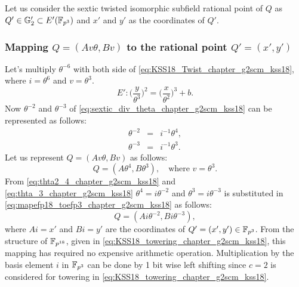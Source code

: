 Let us consider the sextic twisted isomorphic subfield rational point of $Q$ as $Q' \in {\mathbb{G}}_{2}' \subset E'({\mathbb{F}}_{p^{3}})$ and $x'$ and $y'$ as the coordinates of $Q'$.

\subsubsection{Mapping \texorpdfstring{$Q = (Av\theta, Bv)$}{}  to the rational point  \texorpdfstring{$Q' = (x',y')$}{}}

Let's multiply  $\theta^{-6}$ with both side of \eqref{eq:KSS18_Twist_chapter_g2scm_kss18}, where $i=\theta^6$ and $v = \theta^3$.
\begin{equation}\label{eq:sextic_div_theta_chapter_g2scm_kss18}
E':  \Big(\frac{y}{\theta^3}\Big)^2  = \Big(\frac{x}{\theta^2}\Big)^3+ b.
\end{equation}
 Now $\theta^{-2}$ and $\theta^{-3}$ of  \eqref{eq:sextic_div_theta_chapter_g2scm_kss18} can be represented as follows:
 \begin{subequations}
 \begin{eqnarray}
 \theta^{-2} &  = & i^{-1}\theta^{4}, \label{eq:thta2_4_chapter_g2scm_kss18} \\
 \theta^{-3} &  = & i^{-1}\theta^{3}.\label{eq:thta_3_chapter_g2scm_kss18} 
 \end{eqnarray}
 \end{subequations}
Let us represent $Q = (Av\theta, Bv)$  as follows:
\begin{equation}\label{eq:mapefp18_toefp3_chapter_g2scm_kss18}
Q  =  (A\theta^4, B\theta^3), \quad \text{where $v=\theta^3$}.
\end{equation}
From \eqref{eq:thta2_4_chapter_g2scm_kss18} and \eqref{eq:thta_3_chapter_g2scm_kss18} $ \theta^4 = i\theta^{-2}$ and $\theta^3 = i\theta^{-3}$  is substituted in \eqref{eq:mapefp18_toefp3_chapter_g2scm_kss18}  as 
follows:
\begin{equation}\label{eq:mapefp18_toefp3_chapter_g2scm_kss18.1}
Q  =  (Ai\theta^{-2}, Bi\theta^{-3}),
\end{equation}
where $Ai = x'$ and $Bi = y'$ are the coordinates of $Q' =(x',y') \in \mathbb{F}_{p^3}$. 
 From the structure of $\mathbb{F}_{p^{18}}$, given in \ref{eq:KSS18_towering_chapter_g2scm_kss18}, this mapping has required no expensive arithmetic operation. Multiplication by the basis element $i$ in $\mathbb{F}_{p^3}$ can be done by 1 bit wise left shifting since $c=2$ is considered for towering in \ref{eq:KSS18_towering_chapter_g2scm_kss18}.


